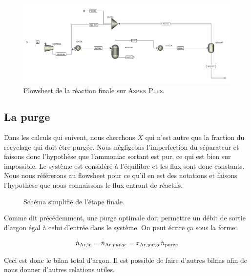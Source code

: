 \begin{figure}[h!]
	\begin{center}
		\includegraphics[scale=0.45,angle=90]{../tache2/img_aspen/flowsheet.jpg}
	\end{center}
	\caption{Flowsheet de la réaction finale sur \textsc{Aspen Plus}.}
	\label{fig:flow_aspen}
\end{figure}

\subsection{La purge}

Dans les calculs qui suivent, nous cherchons $X$ qui n'est autre que 
la fraction du recyclage qui doit être purgée. 
Nous négligeons l'imperfection du séparateur et faisons donc l'hypothèse 
que l'ammoniac sortant est pur, ce qui est bien sur impossible. Le système
est considéré à l'équilibre et les flux sont donc constants. 
Nous nous référerons au flowsheet pour ce qu'il en est des notations et
faisons l'hypothèse que nous connaissons le flux entrant de réactifs.

\begin{figure}[h!]
	\begin{center}
		
	\end{center}
	\caption{Schéma simplifié de l'étape finale.}
	\label{fig:flow_synthese}
\end{figure}

Comme dit précédemment, une purge optimale doit permettre un débit 
de sortie d'argon égal à celui d'entrée dans le système. 
On peut écrire ça sous la forme:

\begin{equation}
\dot{n}_{\ce{Ar},\text{in}}=\dot{n}_{\ce{Ar},purge}=x_{\ce{Ar},\text{purge}} \dot{n}_{\text{purge}}
\end{equation}

Ceci est donc le bilan total d'argon. 
Il est possible de faire d'autres bilans afin de nous donner d'autres relations utiles.

